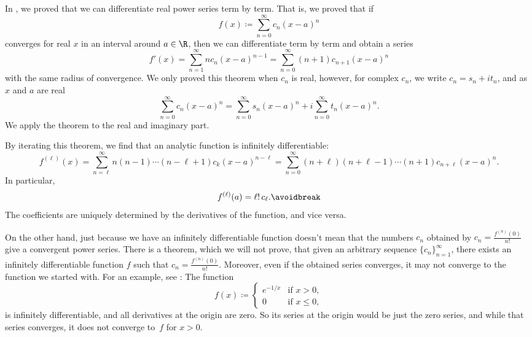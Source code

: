 In , we proved that we can
differentiate real power series term by term.  That is,
we proved that if
\begin{equation*}
f(x) \coloneqq \sum_{n=0}^\infty c_n {(x-a)}^n
\end{equation*}
converges for real $x$ in an interval around $a \in \R$, then we can differentiate
term by term and obtain a series
\begin{equation*}
f'(x) =
\sum_{n=1}^\infty n c_n {(x-a)}^{n-1}
=
\sum_{n=0}^\infty (n+1)c_{n+1} {(x-a)}^{n} 
\end{equation*}
with the same radius of convergence.
We only proved this theorem when $c_n$ is real, however, for complex $c_n$,
we write
$c_n = s_n + i t_n$, and as $x$ and $a$ are real
\begin{equation*}
\sum_{n=0}^\infty c_n {(x-a)}^n
=
\sum_{n=0}^\infty s_n {(x-a)}^n
+
i
\sum_{n=0}^\infty t_n {(x-a)}^n .
\end{equation*}
We apply the theorem to the real and
imaginary part.

By iterating this theorem, we find that an
analytic function is infinitely differentiable:
\begin{equation*}
f^{(\ell)}(x)
=
\sum_{n=\ell}^\infty n(n-1)\cdots(n-\ell+1)c_k {(x-a)}^{n-\ell}
=
\sum_{n=0}^\infty (n+\ell)(n+\ell-1)\cdots (n+1) c_{n+\ell} {(x-a)}^{n} .
\end{equation*}
In particular,
\begin{equation} \label{eq:formulaforpscoeffs}
f^{(\ell)}(a) = \ell! \, c_\ell .
\avoidbreak
\end{equation}
The coefficients are uniquely determined by the derivatives of the
function, and vice versa.

On the other hand, just because we have an infinitely differentiable
function doesn't mean that the numbers $c_n$ obtained by
$c_n = \frac{f^{(n)}(0)}{n!}$ give a convergent power series.
There is a theorem, which we will not prove,
that given an arbitrary sequence $\{ c_n \}_{n=1}^\infty$, there exists an
infinitely differentiable function $f$ such that
$c_n = \frac{f^{(n)}(0)}{n!}$.  Moreover, even if the obtained series
converges, it may not converge to the function we started with.
For an example,
see :  The
function
\begin{equation*}
f(x) \coloneqq
\begin{cases}
e^{-1/x} & \text{if } x > 0,\\
0        & \text{if } x \leq 0,
\end{cases}
\end{equation*}
is infinitely differentiable, and all derivatives at the origin are zero.
So
its series at the origin would be just the zero series, and while that
series converges, it does not converge to~$f$ for $x > 0$.

